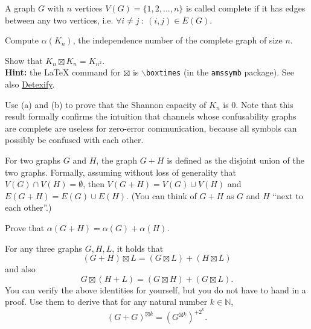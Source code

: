 \documentclass[a4paper,10pt,landscape,twocolumn]{scrartcl}
\begin{document}
\begin{exercise}
A graph $G$ with $n$ vertices $V(G) = \{1,2,...,n\}$ is called complete if it has edges between any two vertices, i.e. $\forall i \neq j \ : \ (i,j) \in E(G)$.
	\begin{subex}[(2pt)]
	Compute $\alpha(K_n)$, the independence number of the complete graph of size $n$.
	\end{subex}
	\begin{subex}[(2pt)]
	Show that $K_n \boxtimes K_n = K_{n^2}$.
	\\\textbf{Hint:} the \LaTeX{} command for $\boxtimes$ is \texttt{$\backslash$boxtimes} (in the \texttt{amssymb} package). See also \href{http://detexify.kirelabs.org/classify.html}{Detexify}.
	\end{subex}
	\begin{subex}[(2pt)]
	Use (a) and (b) to prove that the Shannon capacity of $K_n$ is 0. Note that this result formally confirms the intuition that channels whose confusability graphs are complete are useless for zero-error communication, because all symbols can possibly be confused with each other.
	\end{subex}
\end{exercise}

\begin{exercise}
For two graphs $G$ and $H$, the graph $G + H$ is defined as the disjoint union of the two graphs. Formally, assuming without loss of generality that $V(G) \cap V(H) = \emptyset$, then $V(G + H) = V(G) \cup V(H)$ and $E(G+H) = E(G) \cup E(H)$. (You can think of $G + H$ as $G$ and $H$ ``next to each other''.)
	\begin{subex}[(2pt)]
	Prove that $\alpha(G+H) = \alpha(G) + \alpha(H)$.
	\end{subex}

	\begin{subex}[(3pt)]
	For any three graphs $G,H,L$, it holds that
	\[
	(G+H) \boxtimes L = (G \boxtimes L) + (H \boxtimes L)
	\]
	and also
	\[
	G \boxtimes (H + L) = (G \boxtimes H) + (G \boxtimes L).
	\]
	You can verify the above identities for yourself, but you do not have to hand in a proof. Use them to derive that for any natural number $k \in \mathbb{N}$, \[(G + G)^{\boxtimes k} = (G^{\boxtimes k})^{+2^k}.\]
	\end{subex}
\end{exercise}
\end{document}
